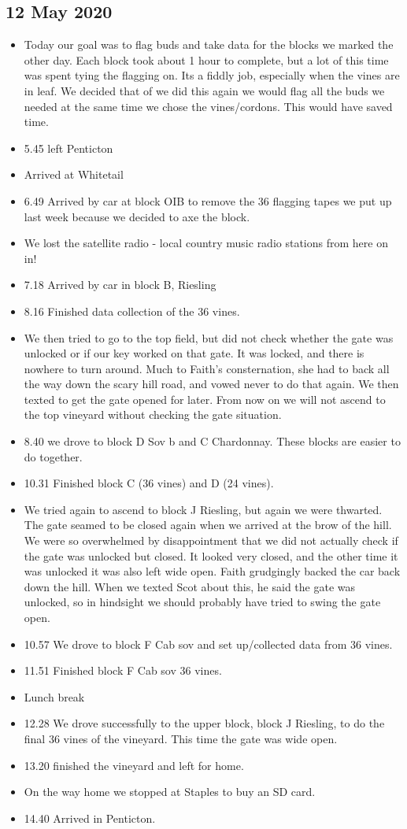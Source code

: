 \documentclass[11pt,letter]{article}
\newenvironment{smitemize}{
\begin{itemize}
  \setlength{\itemsep}{0pt}
  \setlength{\parskip}{0.8pt}
  \setlength{\parsep}{0pt}}
{\end{itemize}
}
\begin{document}
\subsection {12 May 2020}
\begin{smitemize}
\item Today our goal was to flag buds and take data for the blocks we marked the other day. Each block took about 1 hour to complete, but a lot of this time was spent tying the flagging on. Its a fiddly job, especially when the vines are in leaf. We decided that of we did this again we would flag all the buds we needed at the same time we chose the vines/cordons. This would have saved time.
\item 5.45 left Penticton 
\item Arrived at Whitetail 
\item 6.49 Arrived by car at block OIB to remove the 36 flagging tapes we put up last week because we decided to axe the block.
\item We lost the satellite radio - local country music radio stations from here on in!
\item 7.18 Arrived by car in block B, Riesling 
\item 8.16 Finished data collection of the 36 vines. 
\item We then tried to go to the top field, but did not check whether the gate was unlocked or if our key worked on that gate. It was locked, and there is nowhere to turn around. Much to Faith's consternation, she had to back all the way down the scary hill road, and vowed never to do that again. We then texted to get the gate opened for later. From now on we will not ascend to the top vineyard without checking the gate situation. 
\item 8.40 we drove to block D Sov b and C Chardonnay. These blocks are easier to do together.
\item 10.31 Finished block C (36 vines) and D (24 vines).
\item We tried again to ascend to block J Riesling, but again we were thwarted. The gate seamed to be closed again when we arrived at the brow of the hill. We were so overwhelmed by disappointment that we did not actually check if the gate was unlocked but closed. It looked very closed, and the other time it was unlocked it was also left wide open. Faith grudgingly backed the car back down the hill. When we texted Scot about this, he said the gate was unlocked, so in hindsight we should probably have tried to swing the gate open.   
\item 10.57 We drove to block F Cab sov and set up/collected data from 36 vines.
\item 11.51 Finished block F Cab sov 36 vines. 
\item Lunch break
\item 12.28 We drove successfully to the upper block, block J Riesling, to do the final 36 vines of the vineyard. This time the gate was wide open. 
\item 13.20 finished the vineyard and left for home. 
\item On the way home we stopped at Staples to buy an SD card.
\item 14.40 Arrived in Penticton.  


\end{smitemize}
\end{document}
